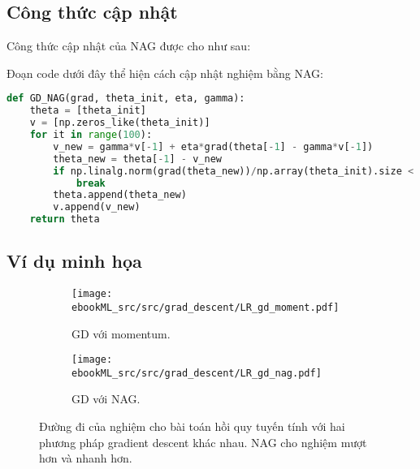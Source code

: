 
\subsection{Công thức cập nhật}
 
Công thức cập nhật của NAG được cho như sau:





Đoạn code dưới đây thể hiện cách cập nhật nghiệm bằng NAG:
\begin{lstlisting}[language=Python]
def GD_NAG(grad, theta_init, eta, gamma):
    theta = [theta_init]
    v = [np.zeros_like(theta_init)]
    for it in range(100):
        v_new = gamma*v[-1] + eta*grad(theta[-1] - gamma*v[-1])
        theta_new = theta[-1] - v_new
        if np.linalg.norm(grad(theta_new))/np.array(theta_init).size < 1e-3:
            break
        theta.append(theta_new)
        v.append(v_new)
    return theta
\end{lstlisting}

\subsection{Ví dụ minh họa }

\begin{figure}[t]
    \begin{subfigure}{0.49\textwidth}
    \texttt{[image: ebookML\_src/src/grad\_descent/LR\_gd\_moment.pdf]}
    \caption{GD với momentum.}
    \label{fig:8_momentnaga}
    \end{subfigure}
    \begin{subfigure}{0.49\textwidth}
    \texttt{[image: ebookML\_src/src/grad\_descent/LR\_gd\_nag.pdf]}
    \caption{GD với NAG.}
    \label{fig:8_momentnagb}
    \end{subfigure}
    \caption{
     Đường đi của nghiệm cho bài toán hồi quy tuyến tính với hai phương pháp
     gradient descent khác nhau. NAG cho nghiệm mượt hơn và nhanh hơn.
    }
    \label{fig:8_momentnag}
\end{figure}

